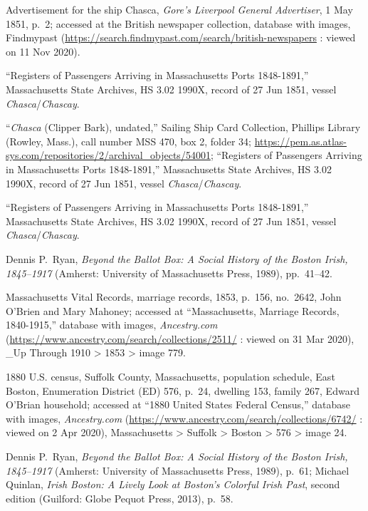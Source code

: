 \begin{thebibliography}{999}
Advertisement for the ship Chasca, \textit{Gore's Liverpool General Advertiser}, 1 May 1851, p.\ 2; accessed at the British newspaper collection, database with images, Findmypast (\url{https://search.findmypast.com/search/british-newspapers} : viewed on 11 Nov 2020).

``Registers of Passengers Arriving in Massachusetts Ports 1848-1891,'' Massachusetts State Archives, HS 3.02 1990X, record of 27 Jun 1851, vessel \textit{Chasca}/\textit{Chascay}.

``\textit{Chasca} (Clipper Bark), undated,'' Sailing Ship Card Collection, Phillips Library (Rowley, Mass.), call number MSS 470, box 2, folder 34; \url{https://pem.as.atlas-sys.com/repositories/2/archival_objects/54001}; ``Registers of Passengers Arriving in Massachusetts Ports 1848-1891,'' Massachusetts State Archives, HS 3.02 1990X, record of 27 Jun 1851, vessel \textit{Chasca}/\textit{Chascay}.

``Registers of Passengers Arriving in Massachusetts Ports 1848-1891,'' Massachusetts State Archives, HS 3.02 1990X, record of 27 Jun 1851, vessel \textit{Chasca}/\textit{Chascay}.

Dennis P.\ Ryan, \textit{Beyond the Ballot Box: A Social History of the Boston Irish, 1845--1917} (Amherst: University of Massachusetts Press, 1989), pp.\ 41--42.

Massachusetts Vital Records, marriage records, 1853, p.\ 156, no.\ 2642, John O'Brien and Mary Mahoney; accessed at ``Massachusetts, Marriage Records, 1840-1915,'' database with images, \textit{Ancestry.com} (\url{https://www.ancestry.com/search/collections/2511/} : viewed on 31 Mar 2020), \_Up Through 1910 > 1853 > image 779.

1880 U.S. census, Suffolk County, Massachusetts, population schedule, East Boston, Enumeration District (ED) 576, p.\ 24, dwelling 153, family 267, Edward O'Brian household; accessed at ``1880 United States Federal Census,'' database with images, \textit{Ancestry.com} (\url{https://www.ancestry.com/search/collections/6742/} : viewed on 2 Apr 2020), Massachusetts > Suffolk > Boston > 576 > image 24.

Dennis P.\ Ryan, \textit{Beyond the Ballot Box: A Social History of the Boston Irish, 1845--1917} (Amherst: University of Massachusetts Press, 1989), p.\ 61; Michael Quinlan, \textit{Irish Boston: A Lively Look at Boston's Colorful Irish Past}, second edition (Guilford: Globe Pequot Press, 2013), p.\ 58.


\end{thebibliography}
